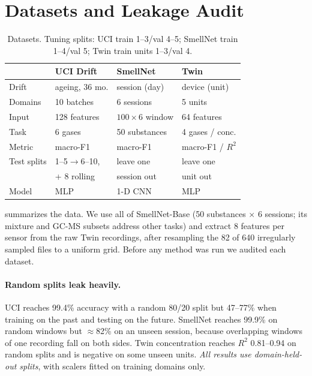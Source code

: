 \documentclass[10pt,twocolumn,letterpaper]{article}
\begin{document}
\section{Datasets and Leakage Audit}
\label{sec:data}
\begin{table}[t]
\centering\footnotesize\setlength{\tabcolsep}{3pt}
\begin{tabular}{@{}llll@{}}
\toprule
 & UCI Drift~\cite{vergara2012drift} & SmellNet~\cite{feng2025smellnet} & Twin~\cite{fonollosa2016twin} \\
\midrule
Drift & ageing, 36 mo. & session (day) & device (unit) \\
Domains & 10 batches & 6 sessions & 5 units \\
Input & 128 features & $100\times6$ window & 64 features \\
Task & 6 gases & 50 substances & 4 gases / conc. \\
Metric & macro-F1 & macro-F1 & macro-F1 / $R^2$ \\
Test splits & 1--5$\to$6--10, & leave one & leave one \\
 & + 8 rolling & session out & unit out \\
Model & MLP & 1-D CNN & MLP \\
\bottomrule
\end{tabular}
\caption{Datasets. Tuning splits: UCI train 1--3/val 4--5; SmellNet train 1--4/val 5; Twin train units 1--3/val 4.}
\label{tab:data}
\end{table}
 summarizes the data. We use all of SmellNet-Base (50 substances $\times$ 6 sessions; its mixture and
GC-MS subsets address other tasks) and extract 8 features per sensor from the raw Twin recordings, after resampling
the 82 of 640 irregularly sampled files to a uniform grid. Before any method was run we audited each dataset.

\paragraph{Random splits leak heavily.} UCI reaches 99.4\% accuracy with a random 80/20 split but 47--77\% when
training on the past and testing on the future. SmellNet reaches 99.9\% on random windows but $\approx$82\% on an
unseen session, because overlapping windows of one recording fall on both sides. Twin concentration reaches $R^2$
0.81--0.94 on random splits and is negative on some unseen units. \emph{All results use domain-held-out splits},
with scalers fitted on training domains only.
\end{document}
